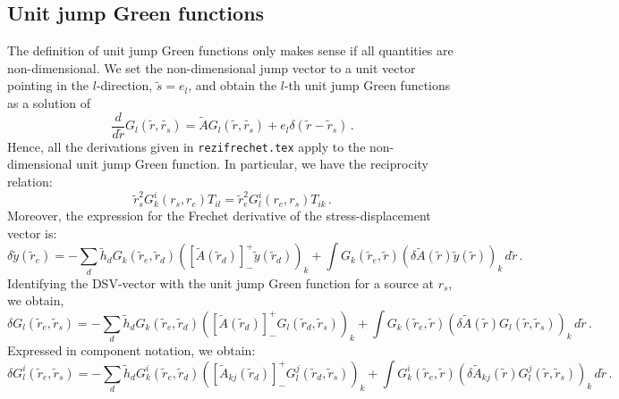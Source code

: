 \documentclass[11pt,a4paper]{article}
\begin{document}
\subsection{Unit jump Green functions}
%
The definition of unit jump Green functions only makes sense if all quantities are non-dimensional. We set the non-dimensional
jump vector to a unit vector pointing in the $l$-direction, $\tilde{s} = e_l$, and obtain the $l$-th unit jump Green functions
as a solution of
\begin{equation}
\frac{d}{d\tilde{r}}G_l(\tilde{r},\tilde{r_s}) = \tilde{A}G_l(\tilde{r},\tilde{r_s})+e_l\delta(\tilde{r}-\tilde{r}_s) \,.
\end{equation}
Hence, all the derivations given in \verb+rezifrechet.tex+ apply to the non-dimensional unit jump Green function.
%
In particular, we have the reciprocity relation:
\begin{equation}
\tilde{r}_s^2 G_k^i(r_s,r_e) T_{il} = \tilde{r}_e^2 G_l^i(r_e,r_s) T_{ik} \,.
\end{equation}
Moreover, the expression for the Frechet derivative of the stress-displacement vector is:
\begin{equation}
\delta \tilde{y}(\tilde{r}_e) = -\sum_d \tilde{h}_d G_k(\tilde{r}_e,\tilde{r}_d)
\left(\left[\tilde{A}(\tilde{r}_d)\right]^+_- \tilde{y}(\tilde{r}_d)\right)_k 
+\int G_k(\tilde{r}_e,\tilde{r})(\delta \tilde{A}(\tilde{r}) \tilde{y}(\tilde{r}))_k \,d\tilde{r} \,.
\end{equation}
Identifying the DSV-vector with the unit jump Green function for a source at $r_s$, we obtain,
\begin{equation}
\delta G_l(\tilde{r}_e,\tilde{r}_s) = -\sum_d \tilde{h}_d G_k(\tilde{r}_e,\tilde{r}_d)
\left(\left[\tilde{A}(\tilde{r}_d)\right]^+_- G_l(\tilde{r}_d,\tilde{r}_s)\right)_k 
+\int G_k(\tilde{r}_e,\tilde{r})(\delta \tilde{A}(\tilde{r}) G_l(\tilde{r},\tilde{r}_s))_k \,d\tilde{r} \,.
\end{equation}
Expressed in component notation, we obtain:
\begin{equation}
\delta G^i_l(\tilde{r}_e,\tilde{r}_s) = -\sum_d \tilde{h}_d G^i_k(\tilde{r}_e,\tilde{r}_d)
\left(\left[\tilde{A}_{kj}(\tilde{r}_d)\right]^+_- G^j_l(\tilde{r}_d,\tilde{r}_s)\right)_k 
+\int G^i_k(\tilde{r}_e,\tilde{r})(\delta \tilde{A}_{kj}(\tilde{r}) G^j_l(\tilde{r},\tilde{r}_s))_k \,d\tilde{r} \,.
\end{equation}
\end{document}
